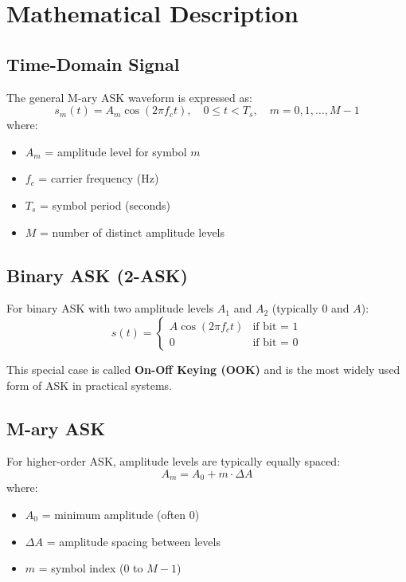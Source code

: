 \section{Mathematical Description}

\subsection{Time-Domain Signal}

The general M-ary ASK waveform is expressed as:
\begin{equation}
s_m(t) = A_m \cos(2\pi f_c t), \quad 0 \leq t < T_s, \quad m = 0, 1, \ldots, M-1
\end{equation}
where:
\begin{itemize}
\item $A_m$ = amplitude level for symbol $m$
\item $f_c$ = carrier frequency (Hz)
\item $T_s$ = symbol period (seconds)
\item $M$ = number of distinct amplitude levels
\end{itemize}

\subsection{Binary ASK (2-ASK)}

For binary ASK with two amplitude levels $A_1$ and $A_2$ (typically 0 and $A$):
\begin{equation}
s(t) = \begin{cases}
A \cos(2\pi f_c t) & \text{if bit = 1} \\
0 & \text{if bit = 0}
\end{cases}
\end{equation}

This special case is called \textbf{On-Off Keying (OOK)} and is the most widely used form of ASK in practical systems.

\subsection{M-ary ASK}

For higher-order ASK, amplitude levels are typically equally spaced:
\begin{equation}
A_m = A_0 + m \cdot \Delta A
\end{equation}
where:
\begin{itemize}
\item $A_0$ = minimum amplitude (often 0)
\item $\Delta A$ = amplitude spacing between levels
\item $m$ = symbol index ($0$ to $M-1$)
\end{itemize}

